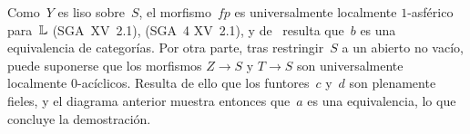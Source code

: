Como~$Y$ es liso sobre~$S$, el morfismo~$fp$ es universalmente localmente
$1$-asférico para~$\mathbb L$
{(SGA~XV~2.1),}
{(SGA~4 XV~2.1),}
y de~\cite[VII 2.1.7]{XIII.2} resulta que~$b$ es una equivalencia de
categorías. Por otra parte, tras restringir~$S$ a un abierto no vacío,
puede suponerse que los morfismos $Z\to S$ y $T\to S$ son universalmente
localmente $0$-acíclicos. Resulta de ello que los funtores~$c$ y~$d$ son
plenamente fieles, y el diagrama anterior muestra entonces que~$a$ es una
equivalencia, lo que concluye la demostración.
